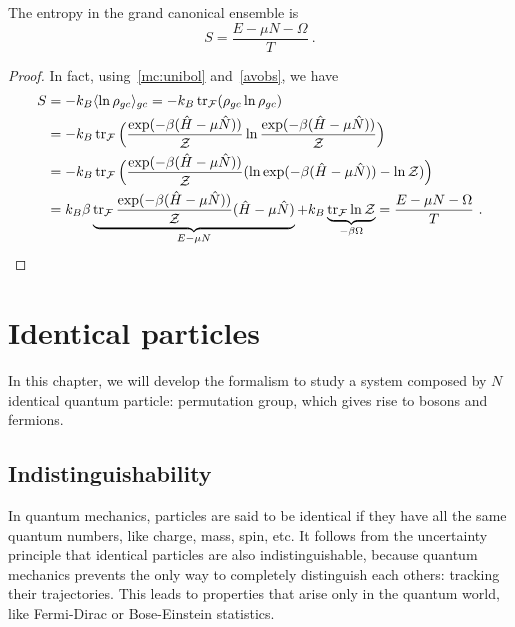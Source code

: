     The entropy in the grand canonical ensemble is 
    \begin{equation*}
        S = \frac{E - \mu N - \Omega}{T} ~.
    \end{equation*}
    \begin{proof}
        In fact, using~\eqref{mc:unibol} and~\eqref{avobs}, we have
        \begin{equation*}
        \begin{aligned}
            S & = - k_B \langle\ln \rho_{gc}\rangle_{gc} = - k_B \operatorname{tr}_{\mathcal F} ( \rho_{gc} \ln \rho_{gc}) \\ & = - k_B \operatorname{tr}_{\mathcal F} \Big ( \frac{\exp(- \beta (\hat H - \mu \hat N))}{\mathcal Z} \ln \frac{\exp(- \beta (\hat H - \mu \hat N))}{\mathcal Z} \Big) \\ & = - k_B \operatorname{tr}_{\mathcal F} \Big ( \frac{\exp(- \beta (\hat H - \mu \hat N))}{\mathcal Z} (\ln \exp(- \beta (\hat H - \mu \hat N)) - \ln \mathcal Z) \Big) \\ & = k_B \beta \underbrace{\operatorname{tr}_{\mathcal F} \frac{\exp(- \beta (\hat H - \mu \hat N))}{\mathcal Z} (\hat H - \mu \hat N)}_{E - \mu N} + k_B \underbrace{\operatorname{tr}_{\mathcal F} \ln \mathcal Z }_{- \beta \Omega} = \frac{E - \mu N - \Omega}{T} ~.
        \end{aligned}
        \end{equation*}
    \end{proof}

\chapter{Identical particles}

    In this chapter, we will develop the formalism to study a system composed by $N$ identical quantum particle: permutation group, which gives rise to bosons and fermions.

\section{Indistinguishability}

    In quantum mechanics, particles are said to be identical if they have all the same quantum numbers, like charge, mass, spin, etc. It follows from the uncertainty principle that identical particles are also indistinguishable, because quantum mechanics prevents the only way to completely distinguish each others: tracking their trajectories. This leads to properties that arise only in the quantum world, like Fermi-Dirac or Bose-Einstein statistics.


